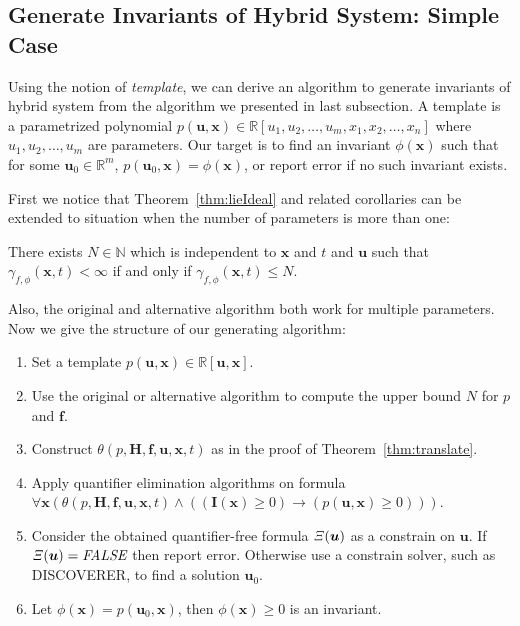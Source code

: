\documentclass{jssc}
\begin{document}
\subsection{Generate Invariants of Hybrid System: Simple Case}
Using the notion of \emph{template}, we can derive an algorithm to generate invariants of hybrid system from the algorithm we presented in last subsection. A template is a parametrized polynomial $p(\boldsymbol{u}, \boldsymbol{x}) \in \mathbb{R}[u_1, u_2, \dots, u_m, x_1, x_2, \dots, x_n]$ where $u_1, u_2, \dots, u_m$ are parameters. Our target is to find an invariant $\phi(\boldsymbol{x})$ such that for some $\boldsymbol{u}_0 \in \mathbb{R}^m$, $p(\boldsymbol{u}_0, \boldsymbol{x}) = \phi(\boldsymbol{x})$, or report error if no such invariant exists.

First we notice that Theorem~\ref{thm:lieIdeal} and related corollaries can be extended to situation when the number of parameters is more than one:
\begin{lemma}
\label{cor:paraLieRank}
There exists $N \in \mathbb{N}$ which is independent to $\boldsymbol{x}$ and $t$ and $\boldsymbol{u}$ such that $\gamma_{f, \phi}(\boldsymbol{x}, t) < \infty$ if and only if $\gamma_{f, \phi}(\boldsymbol{x}, t) \leq N$.
\end{lemma}
Also, the original and alternative algorithm both work for multiple parameters. Now we give the structure of our generating algorithm:
\begin{enumerate}
	\item Set a template $p(\boldsymbol{u}, \boldsymbol{x}) \in \mathbb{R}[\boldsymbol{u},\boldsymbol{x}]$.
	\item Use the original or alternative algorithm to compute the upper bound $N$ for $p$ and $\boldsymbol{f}$.
	\item Construct $\theta(p ,\boldsymbol{H}, \boldsymbol{f},\boldsymbol{u}, \boldsymbol{x}, t)$ as in the proof of Theorem~\ref{thm:translate}.
	\item Apply quantifier elimination algorithms on formula $\forall \boldsymbol{x} (\theta(p, \boldsymbol{H}, \boldsymbol{f}, \boldsymbol{u}, \boldsymbol{x}, t) \wedge ((\boldsymbol{I}(\boldsymbol{x}) \geq 0) \rightarrow (p(\boldsymbol{u}, \boldsymbol{x}) \geq 0)))$.
	\item Consider the obtained quantifier-free formula ${\it \Xi}(\boldsymbol{u})$ as a constrain on $\boldsymbol{u}$. If ${\it \Xi}(\boldsymbol{u}) = \textit{FALSE}$ then report error. Otherwise use a constrain solver, such as DISCOVERER\cite{xia2007discoverer}, to find a solution $\boldsymbol{u}_0$.
	\item Let $\phi(\boldsymbol{x}) = p(\boldsymbol{u}_0, \boldsymbol{x})$, then $\phi(\boldsymbol{x}) \geq 0$ is an invariant.
\end{enumerate}
\end{document}
